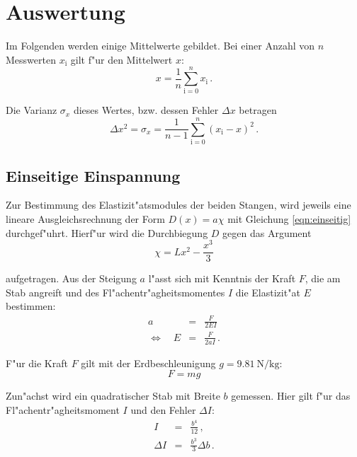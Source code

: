 \clearpage
\section{Auswertung}
	\label{sec:auswertung}
	Im Folgenden werden einige Mittelwerte gebildet.
	Bei einer Anzahl von $n$ Messwerten $x_\mathrm{i}$ gilt f"ur den Mittelwert $x$:
	\begin{equation*}
		x = \frac{1}{n} \sum_{\mathrm{i} = 0}^n {x_\mathrm{i}} \,.
	\end{equation*}

	Die Varianz $\sigma_x$ dieses Wertes, bzw. dessen Fehler $\Delta x$ betragen
	\begin{equation*}
		\Delta x^2 = \sigma_x = \frac{1}{n - 1} \sum_{\mathrm{i} = 0}^n{\left(x_\mathrm{i} - x\right)^2} \,.
	\end{equation*}

	\subsection{Einseitige Einspannung}
	\label{subsec:einseitig}
		Zur Bestimmung des Elastizit"atsmodules der beiden Stangen, wird jeweils eine lineare Ausgleichsrechnung der Form $D(x) = a\chi$ mit Gleichung \eqref{eqn:einseitig} durchgef"uhrt.
		Hierf"ur wird die Durchbiegung $D$ gegen das Argument
		\begin{equation*}
			\chi = Lx^2 - \frac{x^3}{3}
		\end{equation*}

		aufgetragen. Aus der Steigung $a$ l"asst sich mit Kenntnis der Kraft $F$, die am Stab angreift und des Fl"achentr"agheitsmomentes $I$ die Elastizit"at $E$ bestimmen:
		\begin{eqnarray*}
			a & = & \frac{F}{2EI} \\
			\Leftrightarrow \quad E & = & \frac{F}{2aI} \,.
		\end{eqnarray*}

		F"ur die Kraft $F$ gilt mit der Erdbeschleunigung $g = \SI{9.81}{\newton \per \kilo \gram}$:
		\begin{equation*}
			F = mg
		\end{equation*}

		Zun"achst wird ein quadratischer Stab mit Breite $b$ gemessen. Hier gilt f"ur das Fl"achentr"agheitsmoment $I$ und den Fehler $\Delta I$:
		\begin{eqnarray*}
			I & = & \frac{b^4}{12} \,, \\
			\Delta I & = & \frac{b^3}{3}\Delta b \,.
		\end{eqnarray*}

